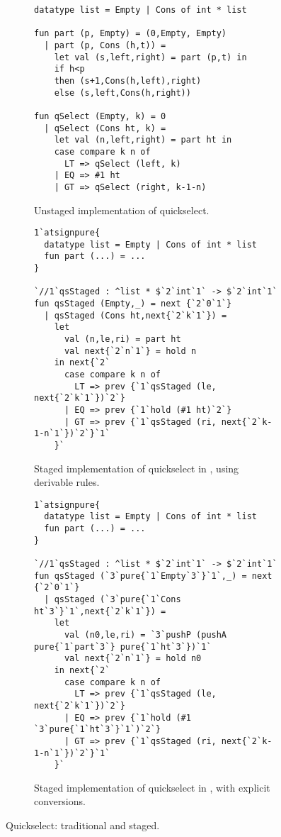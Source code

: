 
\begin{figure*}
\begin{subfigure}{0.5\textwidth}
\begin{lstlisting} 
datatype list = Empty | Cons of int * list

fun part (p, Empty) = (0,Empty, Empty) 
  | part (p, Cons (h,t)) = 
    let val (s,left,right) = part (p,t) in 
    if h<p 
    then (s+1,Cons(h,left),right) 
    else (s,left,Cons(h,right))

fun qSelect (Empty, k) = 0
  | qSelect (Cons ht, k) =
    let val (n,left,right) = part ht in
    case compare k n of
      LT => qSelect (left, k)
    | EQ => #1 ht
    | GT => qSelect (right, k-1-n)
\end{lstlisting}
\caption{Unstaged implementation of quickselect.}
\label{fig:qs-unstaged}
\end{subfigure}%
\begin{subfigure}{0.5\textwidth}
\begin{lstlisting} 
1`atsignpure{
  datatype list = Empty | Cons of int * list
  fun part (...) = ...
} 

`//1`qsStaged : ^list * $`2`int`1` -> $`2`int`1`
fun qsStaged (Empty,_) = next {`2`0`1`}
  | qsStaged (Cons ht,next{`2`k`1`}) = 
    let 
      val (n,le,ri) = part ht
      val next{`2`n`1`} = hold n 
    in next{`2`
      case compare k n of
        LT => prev {`1`qsStaged (le, next{`2`k`1`})`2`}
      | EQ => prev {`1`hold (#1 ht)`2`}
      | GT => prev {`1`qsStaged (ri, next{`2`k-1-n`1`})`2`}`1`
    }`
\end{lstlisting}
\caption{Staged implementation of quickselect in \lang, using derivable rules.}
\vspace{1.3em}
\label{fig:qs-staged}
\end{subfigure}
\begin{subfigure}{0.5\textwidth}
\begin{lstlisting} 
1`atsignpure{
  datatype list = Empty | Cons of int * list
  fun part (...) = ...
} 

`//1`qsStaged : ^list * $`2`int`1` -> $`2`int`1`
fun qsStaged (`3`pure{`1`Empty`3`}`1`,_) = next {`2`0`1`}
  | qsStaged (`3`pure{`1`Cons ht`3`}`1`,next{`2`k`1`}) = 
    let 
      val (n0,le,ri) = `3`pushP (pushA pure{`1`part`3`} pure{`1`ht`3`})`1`
      val next{`2`n`1`} = hold n0
    in next{`2`
      case compare k n of
        LT => prev {`1`qsStaged (le, next{`2`k`1`})`2`}
      | EQ => prev {`1`hold (#1 `3`pure{`1`ht`3`}`1`)`2`}
      | GT => prev {`1`qsStaged (ri, next{`2`k-1-n`1`})`2`}`1`
    }`
\end{lstlisting}
\caption{Staged implementation of quickselect in \lang, with explicit conversions.}
\vspace{1.3em}
\label{fig:qs-staged}
\end{subfigure}
\caption{Quickselect: traditional and staged.}
\end{figure*}


